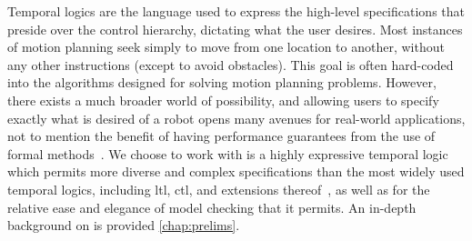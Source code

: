 Temporal logics are the language used to express the high-level specifications that preside over the control hierarchy, dictating what the user desires. Most instances of motion planning seek simply to move from one location to another, without any other instructions (except to avoid obstacles). This goal is often hard-coded into the algorithms designed for solving motion planning problems. However, there exists a much broader world of possibility, and allowing users to specify exactly what is desired of a robot opens many avenues for real-world applications, not to mention the benefit of having performance guarantees from the use of formal methods~\cite{Lin2014}. We choose to work with \mucalc{} is a highly expressive temporal logic which permits more diverse and complex specifications than the most widely used temporal logics, including \gls{ltl}, \gls{ctl}, and extensions thereof~\cite{Karaman2009}, as well as for the relative ease and elegance of model checking that it permits. An in-depth background on \mucalc{} is provided \autoref{chap:prelims}.

